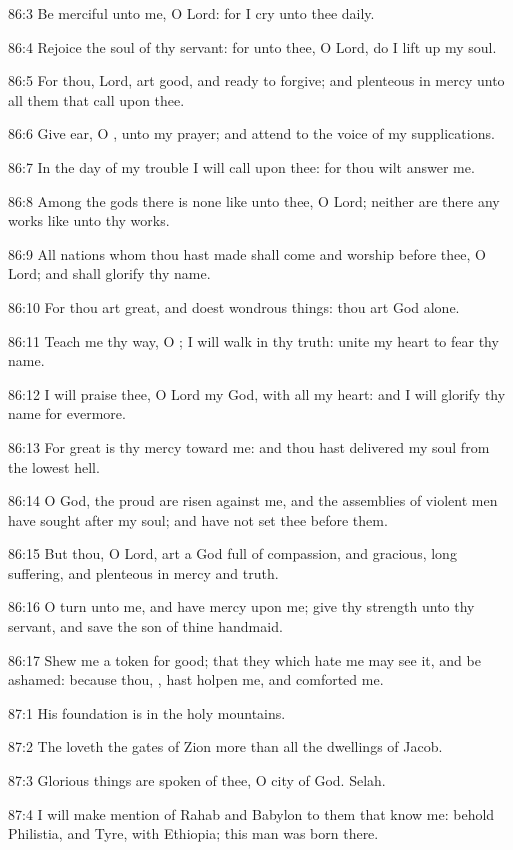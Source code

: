 86:3 Be merciful unto me, O Lord: for I cry unto thee daily.

86:4 Rejoice the soul of thy servant: for unto thee, O Lord, do I lift
up my soul.

86:5 For thou, Lord, art good, and ready to forgive; and plenteous in
mercy unto all them that call upon thee.

86:6 Give ear, O \LORD, unto my prayer; and attend to the voice of my
supplications.

86:7 In the day of my trouble I will call upon thee: for thou wilt
answer me.

86:8 Among the gods there is none like unto thee, O Lord; neither are
there any works like unto thy works.

86:9 All nations whom thou hast made shall come and worship before
thee, O Lord; and shall glorify thy name.

86:10 For thou art great, and doest wondrous things: thou art God
alone.

86:11 Teach me thy way, O \LORD; I will walk in thy truth: unite my
heart to fear thy name.

86:12 I will praise thee, O Lord my God, with all my heart: and I will
glorify thy name for evermore.

86:13 For great is thy mercy toward me: and thou hast delivered my
soul from the lowest hell.

86:14 O God, the proud are risen against me, and the assemblies of
violent men have sought after my soul; and have not set thee before
them.

86:15 But thou, O Lord, art a God full of compassion, and gracious,
long suffering, and plenteous in mercy and truth.

86:16 O turn unto me, and have mercy upon me; give thy strength unto
thy servant, and save the son of thine handmaid.

86:17 Shew me a token for good; that they which hate me may see it,
and be ashamed: because thou, \LORD, hast holpen me, and comforted me.



87:1 His foundation is in the holy mountains.

87:2 The \LORD loveth the gates of Zion more than all the dwellings of
Jacob.

87:3 Glorious things are spoken of thee, O city of God. Selah.

87:4 I will make mention of Rahab and Babylon to them that know me:
behold Philistia, and Tyre, with Ethiopia; this man was born there.

